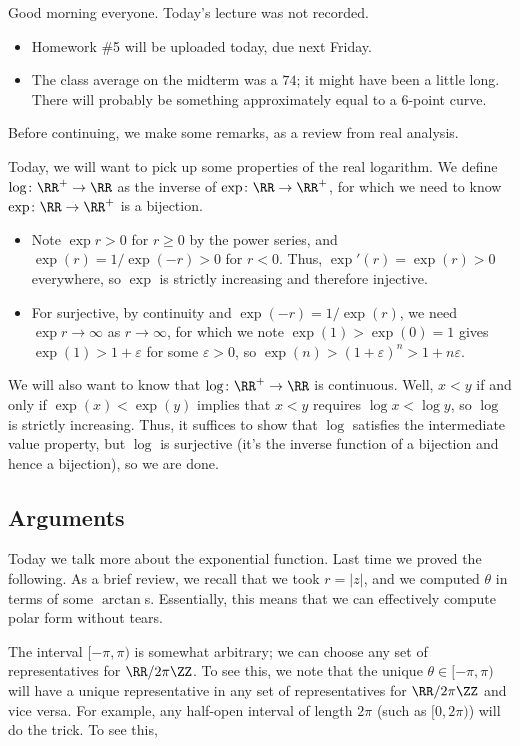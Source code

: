 
Good morning everyone. Today's lecture was not recorded.
\begin{itemize}
	\item Homework \#5 will be uploaded today, due next Friday.
	\item The class average on the midterm was a $74$; it might have been a little long. There will probably be something approximately equal to a $6$-point curve.
\end{itemize}
Before continuing, we make some remarks, as a review from real analysis.
\begin{remark}[Nir]
	Today, we will want to pick up some properties of the real logarithm. We define $\log\colon \RR^+\to\RR$ as the inverse of $\exp\colon \RR\to\RR^+$, for which we need to know $\exp\colon \RR\to\RR^+$ is a bijection.
	\begin{itemize}
		\item Note $\exp r>0$ for $r\ge0$ by the power series, and $\exp(r)=1/\exp(-r)>0$ for $r<0$. Thus, $\exp'(r)=\exp(r)>0$ everywhere, so $\exp$ is strictly increasing and therefore injective.
		\item For surjective, by continuity and $\exp(-r)=1/\exp(r)$, we need $\exp r\to\infty$ as $r\to\infty$, for which we note $\exp(1)>\exp(0)=1$ gives $\exp(1)>1+\varepsilon$ for some $\varepsilon>0$, so $\exp(n)>(1+\varepsilon)^n>1+n\varepsilon$.
	\end{itemize}
\end{remark}
\begin{remark}[Nir]
	We will also want to know that $\log\colon \RR^+\to\RR$ is continuous. Well, $x<y$ if and only if $\exp(x)<\exp(y)$ implies that $x<y$ requires $\log x<\log y$, so $\log$ is strictly increasing. Thus, it suffices to show that $\log$ satisfies the intermediate value property, but $\log$ is surjective (it's the inverse function of a bijection and hence a bijection), so we are done.
\end{remark}

\subsection{Arguments}
Today we talk more about the exponential function. Last time we proved the following.
\polarform*
\noindent As a brief review, we recall that we took $r=|z|$, and we computed $\theta$ in terms of some $\arctan$s. Essentially, this means that we can effectively compute polar form without tears.
\begin{remark}
	The interval $[-\pi,\pi)$ is somewhat arbitrary; we can choose any set of representatives for $\RR/2\pi\ZZ$. To see this, we note that the unique $\theta\in[-\pi,\pi)$ will have a unique representative in any set of representatives for $\RR/2\pi\ZZ$ and vice versa. For example, any half-open interval of length $2\pi$ (such as $[0,2\pi)$) will do the trick. To see this, 
\end{remark}

